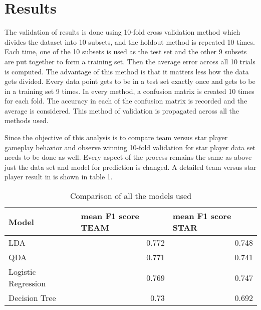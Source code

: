 \documentclass[conference]{IEEEtran}
\begin{document}
\section{Results}

The validation of results is done using 10-fold cross validation method which divides the dataset into 10 subsets, and the holdout method is repeated 10 times. Each time, one of the 10 subsets is used as the test set and the other 9 subsets are put together to form a training set. Then the average error across all 10 trials is computed. The advantage of this method is that it matters less how the data gets divided. Every data point gets to be in a test set exactly once and gets to be in a training set 9 times. In every method, a confusion matrix is created 10 times for each fold. The accuracy in each of the confusion matrix is recorded and the average is considered. This method of validation is propagated across all the methods used.

Since the objective of this analysis is to compare team versus star player gameplay behavior and observe winning 10-fold validation for star player data set needs to be done as well. Every aspect of the process remains the same as above just the data set and model for prediction is changed.
A detailed team versus star player result in is shown in table 1.

\begin{table}[htbp]
  \centering
  \caption{Comparison of all the models used}
    \begin{tabular}{|l|r|r|}
    \toprule
    Model & \multicolumn{1}{l|}{mean F1 score TEAM} & \multicolumn{1}{l|}{mean F1 score STAR} \\
    \midrule
    LDA   & 0.772 & 0.748 \\
    \midrule
    QDA   & 0.771 & 0.741 \\
    \midrule
    Logistic Regression & 0.769 & 0.747 \\
  \midrule
    Decision Tree & 0.73  & 0.692 \\
    \bottomrule
    \end{tabular}%
  \label{tab:addlabel}%
\end{table}%
 
\end{document}
